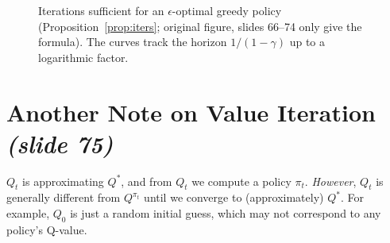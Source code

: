\documentclass[11pt,a4paper]{article}
\newcommand{\slide}[1]{\texorpdfstring{\emph{(slide #1)}}{(slide #1)}}
\theoremstyle{plain}
\theoremstyle{definition}
\theoremstyle{remark}
\begin{document}
\begin{figure}[htbp]
\centering
{}
\caption{Iterations sufficient for an $\epsilon$-optimal greedy policy (Proposition~\ref{prop:iters}; original figure, slides 66--74 only give the formula). The curves track the horizon $1/(1-\gamma)$ up to a logarithmic factor.}
\label{fig:iters}
\end{figure}

\section{Another Note on Value Iteration \slide{75}}
$Q_t$ is approximating $Q^*$, and from $Q_t$ we compute a policy $\pi_t$. \emph{However}, $Q_t$ is generally different from $Q^{\pi_t}$ until we converge to (approximately) $Q^*$. For example, $Q_0$ is just a random initial guess, which may not correspond to any policy's Q-value.
\end{document}
